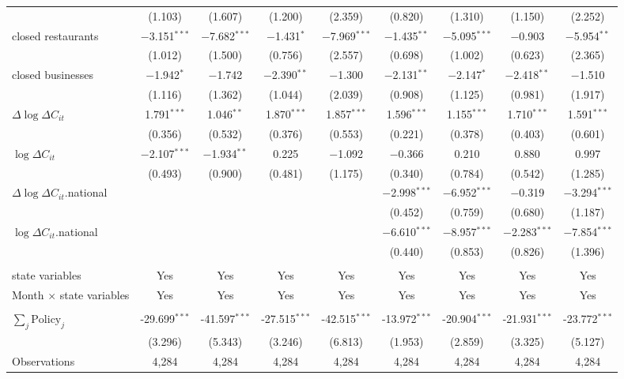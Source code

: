 \documentclass{beamer}
\begin{document}
\begin{frame}
\begin{table}[!htbp]
\begin{minipage}{\linewidth}
{\begin{tabular}{@{\extracolsep{1pt}}lcccccccc}
  & (1.103) & (1.607) & (1.200) & (2.359) & (0.820) & (1.310) & (1.150) & (2.252) \\ 
  closed restaurants & $-$3.151$^{***}$ & $-$7.682$^{***}$ & $-$1.431$^{*}$ & $-$7.969$^{***}$ & $-$1.435$^{**}$ & $-$5.095$^{***}$ & $-$0.903 & $-$5.954$^{**}$ \\ 
  & (1.012) & (1.500) & (0.756) & (2.557) & (0.698) & (1.002) & (0.623) & (2.365) \\ 
  closed businesses & $-$1.942$^{*}$ & $-$1.742 & $-$2.390$^{**}$ & $-$1.300 & $-$2.131$^{**}$ & $-$2.147$^{*}$ & $-$2.418$^{**}$ & $-$1.510 \\ 
  & (1.116) & (1.362) & (1.044) & (2.039) & (0.908) & (1.125) & (0.981) & (1.917) \\ 
  $\Delta \log \Delta C_{it}$ & 1.791$^{***}$ & 1.046$^{**}$ & 1.870$^{***}$ & 1.857$^{***}$ & 1.596$^{***}$ & 1.155$^{***}$ & 1.710$^{***}$ & 1.591$^{***}$ \\ 
  & (0.356) & (0.532) & (0.376) & (0.553) & (0.221) & (0.378) & (0.403) & (0.601) \\ 
  $\log \Delta C_{it}$ & $-$2.107$^{***}$ & $-$1.934$^{**}$ & 0.225 & $-$1.092 & $-$0.366 & 0.210 & 0.880 & 0.997 \\ 
  & (0.493) & (0.900) & (0.481) & (1.175) & (0.340) & (0.784) & (0.542) & (1.285) \\ 
  $\Delta \log \Delta C_{it}$.national &  &  &  &  & $-$2.998$^{***}$ & $-$6.952$^{***}$ & $-$0.319 & $-$3.294$^{***}$ \\ 
  &  &  &  &  & (0.452) & (0.759) & (0.680) & (1.187) \\ 
  $\log \Delta C_{it}$.national &  &  &  &  & $-$6.610$^{***}$ & $-$8.957$^{***}$ & $-$2.283$^{***}$ & $-$7.854$^{***}$ \\ 
  &  &  &  &  & (0.440) & (0.853) & (0.826) & (1.396) \\ 
 \hline \\[-1.8ex] 
state variables & Yes & Yes & Yes & Yes & Yes & Yes & Yes & Yes \\ 
Month $\times$ state variables & Yes & Yes & Yes & Yes & Yes & Yes & Yes & Yes \\ 
\hline \\[-1.8ex] 
$\sum_j \mathrm{Policy}_j$ & -29.699$^{***}$ & -41.597$^{***}$ & -27.515$^{***}$ & -42.515$^{***}$ & -13.972$^{***}$ & -20.904$^{***}$ & -21.931$^{***}$ & -23.772$^{***}$ \\ 
 & (3.296) & (5.343) & (3.246) & (6.813) & (1.953) & (2.859) & (3.325) & (5.127) \\ 
Observations & 4,284 & 4,284 & 4,284 & 4,284 & 4,284 & 4,284 & 4,284 & 4,284 \\ 

\end{tabular}}
\end{minipage}
\end{table}
\end{frame}
\end{document}
